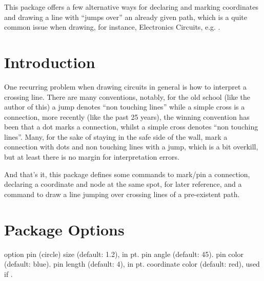 \documentclass[10pt]{article}
\begin{document}
  

\begin{typesetabstract}
 
This package offers a few alternative ways for declaring and marking coordinates and drawing a line with ``jumps over'' an already given path, which is a quite common issue when drawing, for instance, Electronics Circuits, e.g. .
\end{typesetabstract}


\section{Introduction}
One recurring problem when drawing circuits in general is how to interpret a crossing line. There are many conventions, notably, for the old school (like the author of this) a jump denotes ``non touching lines'' while a simple cross is a connection, more recently (like the past 25 years), the winning convention has been that a dot marks a connection, whilst a simple cross denotes ``non touching lines''. Many, for the sake of staying in the safe side of the wall,  mark a connection with dots and non touching lines with a jump, which is a bit overkill, but at least there is no margin for interpretation errors.

And that's it, this package defines some commands to mark/pin a connection, declaring a coordinate and node at the same spot, for later reference, and a command to draw a line jumping over crossing lines of a pre-existent path.


\section{Package Options}\label{options}
\begin{describelist}{option}
   {pin (circle) size (default: 1.2), in pt.}
   {pin angle (default: 45). }
   {pin color (default: blue).}
   {pin length (default: 4), in pt.}
   {coordinate color (default: red), used if \tsobj{\showcoordstrue}.}
\end{describelist}
 
\end{document}
